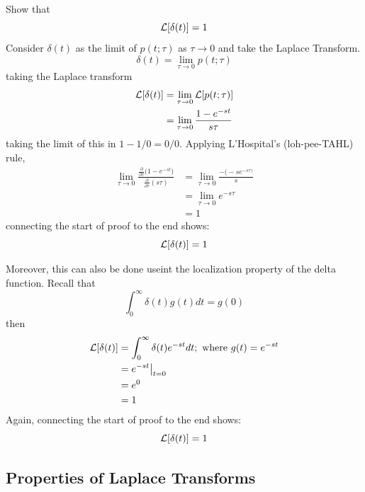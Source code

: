 \documentclass[12pt,letter]{article}
\begin{document}
\begin{bookproof}
Show that
\begin{equation}
\mathcal{L}{\left[\delta(t)\right]} = 1
\end{equation}
Consider $\delta(t)$ as the limit of $p(t;\tau) $ as $\tau \rightarrow 0$ and take the Laplace Transform. 
\begin{equation}
\delta(t) = \lim\limits_{\tau \rightarrow 0} p(t;\tau) 
\end{equation}
taking the Laplace transform
\begin{align}
\mathcal{L}{\left[\delta(t)\right]} &= \lim\limits_{\tau \rightarrow 0} \mathcal{L}{\left[p(t;\tau)\right]} \\ \nonumber
&=  \lim\limits_{\tau \rightarrow 0} \frac{1-e^{-st}}{s \tau}
\end{align}
taking the limit of this in ${1-1}/0 = 0/0$. Applying L'Hospital's (loh-pee-TAHL) rule, 
\begin{align}
\lim\limits_{\tau \rightarrow 0} \frac{ \frac{\partial}{\partial \tau} \big(     1-e^{-s t}    \big)  }{ \frac{\partial}{\partial \tau} (s \tau)} &= \lim\limits_{\tau \rightarrow 0} \frac{- \big(-s e^{-s \tau \big)}}{s}  \\ \nonumber
&=  \lim\limits_{\tau \rightarrow 0} e^{-s \tau} \\ \nonumber
&= 1
\end{align}
connecting the start of proof to the end shows:
\begin{equation}
\mathcal{L}{\left[\delta(t)\right]} = 1
\end{equation}

Moreover, this can also be done useint the localization property of the delta function. Recall that
\begin{equation}
\int_{0}^{\infty} \delta(t) g(t) dt = g(0)
\end{equation}
then
\begin{align}
\mathcal{L}{\left[\delta(t)\right]} &= \int_{0}^{\infty} \delta(t) e^{-s t} dt; \text{ where } g(t) = e^{-s t} \\ \nonumber
&= e^{-s t}\big|_{t=0} \\ \nonumber
&= e^0 \\ \nonumber
&= 1
\end{align}
Again, connecting the start of proof to the end shows:
\begin{equation}
\mathcal{L}{\left[\delta(t)\right]} = 1
\end{equation}
\end{bookproof}

\subsection{Properties of Laplace Transforms}
\end{document}
